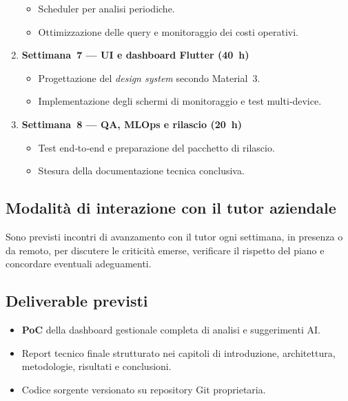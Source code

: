 \begin{enumerate}
        \begin{itemize}
            \item Scheduler per analisi periodiche.
            \item Ottimizzazione delle query e monitoraggio dei costi operativi.
        \end{itemize}
    \item \textbf{Settimana~7 — UI e dashboard Flutter (40~h)}
        \begin{itemize}
            \item Progettazione del \textit{design system} secondo Material~3.
            \item Implementazione degli schermi di monitoraggio e test multi‑device.
        \end{itemize}
    \item \textbf{Settimana~8 — QA, MLOps e rilascio (20~h)}
        \begin{itemize}
            \item Test end‑to‑end e preparazione del pacchetto di rilascio.
            \item Stesura della documentazione tecnica conclusiva.
        \end{itemize}
\end{enumerate}

\subsection{Modalità di interazione con il tutor aziendale}

Sono previsti incontri di avanzamento con il tutor ogni settimana, in presenza o da remoto, per discutere le criticità emerse, verificare il rispetto del piano e concordare eventuali adeguamenti.

\subsection{Deliverable previsti}

\begin{itemize}
    \item \textbf{PoC} della dashboard gestionale completa di analisi e suggerimenti AI.
    \item Report tecnico finale strutturato nei capitoli di introduzione, architettura, metodologie, risultati e conclusioni.
    \item Codice sorgente versionato su repository Git proprietaria.
\end{itemize}

\newpage



